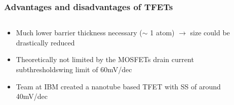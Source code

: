 \documentclass{beamer}
\begin{document}
\begin{frame}\frametitle{Advantages and disadvantages of TFETs}
\begin{columns}
\begin{column}{5.8cm}
\begin{itemize}
  \item<1-> Much lower barrier thickness necessary ($\sim$ 1 atom) \newline $\rightarrow$ size could be drastically reduced
  \item<2-> Theoretically not limited by the MOSFETs drain current subthresholdswing limit of 60mV/dec
  \item<3-> Team at IBM created a nanotube based TFET with SS of around 40mV/dec
\end{itemize}
\end{column}
\begin{column}{6cm}
\begin{overprint}







\end{overprint}
\end{column}
\end{columns}
\end{frame}
\end{document}
